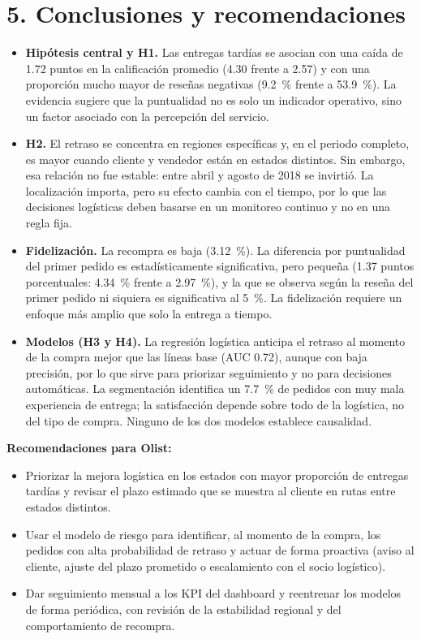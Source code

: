\documentclass[a4paper,stu,12pt,donotrepeattitle,floatsintext]{apa7}
\begin{document}
\section{5. Conclusiones y recomendaciones}
\begin{itemize}
\item \textbf{Hipótesis central y H1.} Las entregas tardías se asocian con una caída de 1.72 puntos en la calificación promedio (4.30 frente a 2.57) y con una proporción mucho mayor de reseñas negativas (9.2~\% frente a 53.9~\%). La evidencia sugiere que la puntualidad no es solo un indicador operativo, sino un factor asociado con la percepción del servicio.
\item \textbf{H2.} El retraso se concentra en regiones específicas y, en el periodo completo, es mayor cuando cliente y vendedor están en estados distintos. Sin embargo, esa relación no fue estable: entre abril y agosto de 2018 se invirtió. La localización importa, pero su efecto cambia con el tiempo, por lo que las decisiones logísticas deben basarse en un monitoreo continuo y no en una regla fija.
\item \textbf{Fidelización.} La recompra es baja (3.12~\%). La diferencia por puntualidad del primer pedido es estadísticamente significativa, pero pequeña (1.37 puntos porcentuales: 4.34~\% frente a 2.97~\%), y la que se observa según la reseña del primer pedido ni siquiera es significativa al 5~\%. La fidelización requiere un enfoque más amplio que solo la entrega a tiempo.
\item \textbf{Modelos (H3 y H4).} La regresión logística anticipa el retraso al momento de la compra mejor que las líneas base (AUC 0.72), aunque con baja precisión, por lo que sirve para priorizar seguimiento y no para decisiones automáticas. La segmentación identifica un 7.7~\% de pedidos con muy mala experiencia de entrega; la satisfacción depende sobre todo de la logística, no del tipo de compra. Ninguno de los dos modelos establece causalidad.
\end{itemize}
\textbf{Recomendaciones para Olist:}

\begin{itemize}
\item Priorizar la mejora logística en los estados con mayor proporción de entregas tardías y revisar el plazo estimado que se muestra al cliente en rutas entre estados distintos.
\item Usar el modelo de riesgo para identificar, al momento de la compra, los pedidos con alta probabilidad de retraso y actuar de forma proactiva (aviso al cliente, ajuste del plazo prometido o escalamiento con el socio logístico).
\item Dar seguimiento mensual a los KPI del dashboard y reentrenar los modelos de forma periódica, con revisión de la estabilidad regional y del comportamiento de recompra.
\end{itemize}
\end{document}
